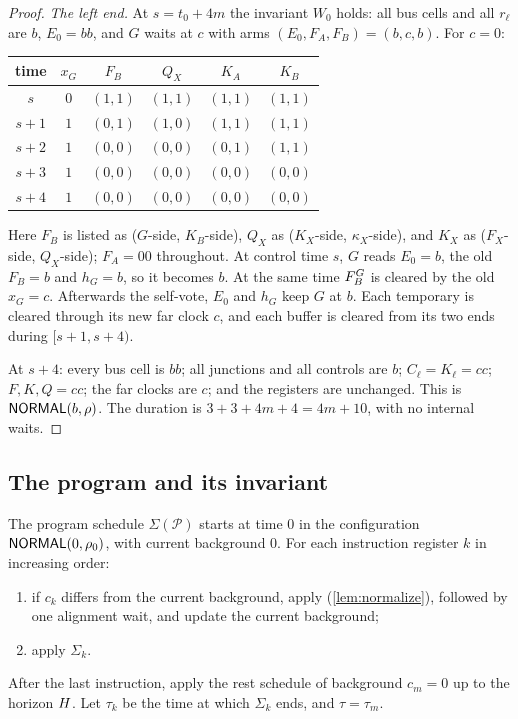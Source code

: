 \begin{proof}
\emph{The left end.} At $s=t_0+4m$ the invariant $W_0$ holds: all bus cells and all $r_\ell$ are $b$,
$E_0=bb$, and $G$ waits at $c$ with arms $(E_0,F_A,F_B)=(b,c,b)$. For $c=0$:
\begin{center}\small
\begin{tabular}{cccccc}\toprule
time & $x_G$ & $F_B$ & $Q_X$ & $K_A$ & $K_B$\\\midrule
$s$   & $0$ & $(1,1)$ & $(1,1)$ & $(1,1)$ & $(1,1)$\\
$s+1$ & $1$ & $(0,1)$ & $(1,0)$ & $(1,1)$ & $(1,1)$\\
$s+2$ & $1$ & $(0,0)$ & $(0,0)$ & $(0,1)$ & $(1,1)$\\
$s+3$ & $1$ & $(0,0)$ & $(0,0)$ & $(0,0)$ & $(0,0)$\\
$s+4$ & $1$ & $(0,0)$ & $(0,0)$ & $(0,0)$ & $(0,0)$\\\bottomrule
\end{tabular}
\end{center}
Here $F_B$ is listed as ($G$-side, $K_B$-side), $Q_X$ as ($K_X$-side, $\kappa_X$-side), and $K_X$ as
($F_X$-side, $Q_X$-side); $F_A=00$ throughout.
At control time $s$, $G$ reads $E_0=b$, the old $F_B=b$ and $h_G=b$, so it becomes $b$. At the same
time $F_B^{G}$ is cleared by the old $x_G=c$. Afterwards the self-vote, $E_0$ and $h_G$ keep $G$ at
$b$. Each temporary is cleared through its new far clock $c$, and each buffer is cleared from its two
ends during $[s+1,s+4)$.

At $s+4$: every bus cell is $bb$; all junctions and all controls are $b$; $C_\ell=K_\ell=cc$;
$F,K,Q=cc$; the far clocks are $c$; and the registers are unchanged. This is $\textsf{NORMAL}(b,\rho)$. The
duration is $3+3+4m+4=4m+10$, with no internal waits.
\end{proof}

\subsection{The program and its invariant}\label{sec:program}

\begin{definition}\label{def:programschedule}
The program schedule $\Sigma(\mathcal P)$ starts at time $0$ in the configuration
$\textsf{NORMAL}(0,\rho_0)$, with current background $0$. For each instruction register $k$ in increasing order:
\begin{enumerate}[label=(\roman*)]
\item if $c_k$ differs from the current background, apply  (\cref{lem:normalize}),
  followed by one alignment wait, and update the current background;
\item apply $\Sigma_k$.
\end{enumerate}
After the last instruction, apply the rest schedule of background $c_m=0$ up to the horizon $H$.
Let $\tau_k$ be the time at which $\Sigma_k$ ends, and $\tau=\tau_m$.
\end{definition}

